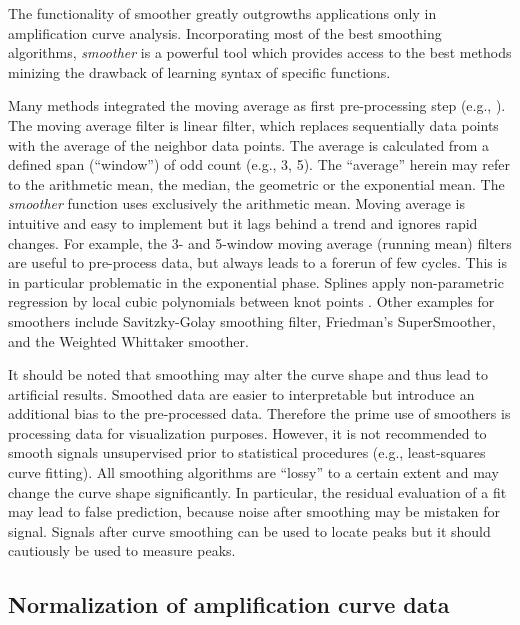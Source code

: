 \documentclass[twocolumn]{bmcart}%
\begin{document}
The functionality of smoother greatly outgrowths applications only in 
amplification curve analysis. Incorporating most of the best smoothing 
algorithms, \textsl{smoother} is a powerful tool which provides access to the 
best methods minizing the drawback of learning syntax of specific functions.
 
  Many methods integrated the moving average as first pre-processing step  
(e.g., \cite{shain_2008}). The moving average filter is linear filter, which 
replaces sequentially data points with the average of the neighbor data points. 
The average is calculated from a defined span (``window'') of odd count (e.g., 
3, 5). The ``average'' herein may refer to the arithmetic mean, the median, the 
geometric or the exponential mean. The \textsl{smoother} function uses 
exclusively the arithmetic mean. Moving average is intuitive and easy to 
implement but it lags behind a trend and ignores rapid changes. For example, the 
3- and 5-window moving average (running mean) filters are useful to pre-process 
data, but always leads to a forerun of few cycles. This is in particular 
problematic in the exponential phase. Splines apply non-parametric regression by 
local cubic polynomials between knot points \cite{Nie_2012}. Other examples for 
smoothers include Savitzky-Golay smoothing filter, Friedman's SuperSmoother, and 
the Weighted Whittaker smoother.

  It should be noted that smoothing may alter the curve shape and 
thus lead to artificial results. Smoothed data are easier to interpretable but 
introduce an additional bias to the pre-processed data. Therefore the prime use 
of smoothers is processing data for visualization purposes. However, it is 
not 
recommended to smooth signals unsupervised prior to statistical procedures 
(e.g., least-squares curve fitting). All smoothing algorithms are ``lossy'' to a 
certain extent and may change the curve shape significantly. In particular, the 
residual evaluation of a fit may lead to false prediction, because noise after 
smoothing may be mistaken for signal. Signals after curve smoothing can be used 
to locate peaks but it should cautiously be used to measure peaks.

\subsection*{Normalization of amplification curve data}
\end{document}
